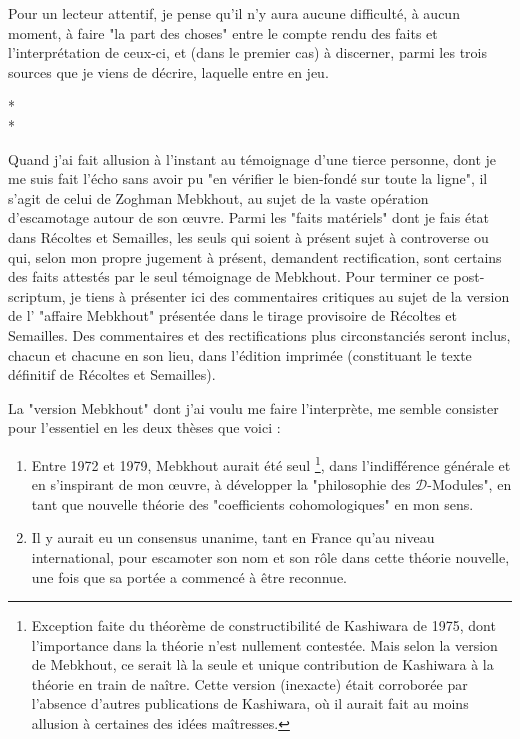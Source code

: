 Pour un lecteur attentif, je pense qu'il n'y aura aucune difficulté, à aucun moment, à faire "la part des choses" entre le compte rendu des faits et l'interprétation de ceux-ci, et (dans le premier cas) à discerner, parmi les trois sources que je viens de décrire, laquelle entre en jeu.


\begin{center}
    * \quad * \\
    *
    \end{center}

Quand j’ai fait allusion à l'instant au témoignage d'une tierce personne, dont je me suis fait l'écho sans avoir pu "en vérifier le bien-fondé sur toute la ligne", il s'agit de celui de Zoghman Mebkhout, au sujet de la vaste opération d'escamotage autour de son œuvre. Parmi les "faits matériels" dont je fais état dans Récoltes et Semailles, les seuls qui soient à présent sujet à controverse ou qui, selon mon propre jugement à présent, demandent rectification, sont certains des faits attestés par le seul témoignage de Mebkhout. Pour terminer ce post-scriptum, je tiens à présenter ici des commentaires critiques au sujet de la version de l' "affaire Mebkhout" présentée dans le tirage provisoire de Récoltes et Semailles. Des commentaires et des rectifications plus circonstanciés seront inclus, chacun et chacune en son lieu, dans l'édition imprimée (constituant le texte définitif de Récoltes et Semailles).

La "version Mebkhout" dont j'ai voulu me faire l'interprète, me semble consister pour l'essentiel en les deux thèses que voici :

\begin{enumerate}
    \item Entre 1972 et 1979, Mebkhout aurait été seul \footnote{Exception faite du théorème de constructibilité de Kashiwara de 1975, dont l'importance dans la théorie n'est nullement contestée. Mais selon la version de Mebkhout, ce serait là la seule et unique contribution de Kashiwara à la théorie en train de naître. Cette version (inexacte) était corroborée par l'absence d'autres publications de Kashiwara, où il aurait fait au moins allusion à certaines des idées maîtresses.}, dans l'indifférence générale et en s'inspirant de mon œuvre, à développer la "philosophie des $\mathscr{D}$-Modules", en tant que nouvelle théorie des "coefficients cohomologiques" en mon sens.
    \item  Il y aurait eu un consensus unanime, tant en France qu'au niveau international, pour escamoter son nom et son rôle dans cette théorie nouvelle, une fois que sa portée a commencé à être reconnue.
\end{enumerate}

